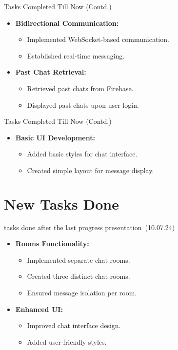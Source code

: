 \documentclass{beamer}
\begin{document}
\begin{frame}{Tasks Completed Till Now (Contd.)}
    \begin{itemize}
        \item \textbf{Bidirectional Communication:}
        \begin{itemize}
            \item Implemented WebSocket-based communication.
            \item Established real-time messaging.
        \end{itemize}
        \item \textbf{Past Chat Retrieval:}
        \begin{itemize}
            \item Retrieved past chats from Firebase.
            \item Displayed past chats upon user login.
        \end{itemize}
    \end{itemize}
\end{frame}

\begin{frame}{Tasks Completed Till Now (Contd.)}
    \begin{itemize}
        \item \textbf{Basic UI Development:}
        \begin{itemize}
            \item Added basic styles for chat interface.
            \item Created simple layout for message display.
        \end{itemize}
    \end{itemize}
\end{frame}

\section{New Tasks Done}

\begin{frame}{tasks done after the last progress presentation (10.07.24)}
    \begin{itemize}
        \item \textbf{Rooms Functionality:}
        \begin{itemize}
            \item Implemented separate chat rooms.
            \item Created three distinct chat rooms.
            \item Ensured message isolation per room.
        \end{itemize}
        \item \textbf{Enhanced UI:}
        \begin{itemize}
            \item Improved chat interface design.
            \item Added user-friendly styles.
        \end{itemize}
    \end{itemize}
\end{frame}
\end{document}

